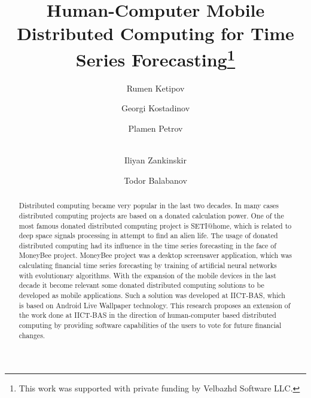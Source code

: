 \documentclass[runningheads]{llncs}
\begin{document}
\title{Human-Computer Mobile Distributed Computing for Time Series Forecasting\thanks{This work was supported with private funding by Velbazhd Software LLC.}}

\author{
	Rumen Ketipov \and
	Georgi Kostadinov \and
	Plamen Petrov \and \\
	Iliyan Zankinskir \and
	Todor Balabanov
}



\maketitle

\begin{abstract}
Distributed computing became very popular in the last two decades. In many cases distributed computing projects are based on a donated calculation power. One of the most famous donated distributed computing project is SETI@home, which is related to deep space signals processing in attempt to find an alien life. The usage of donated distributed computing had its influence in the time series forecasting in the face of MoneyBee\cite{bohn01} project. MoneyBee project was a desktop screensaver application, which was calculating financial time series forecasting by training of artificial neural networks with evolutionary algorithms. With the expansion of the mobile devices in the last decade it become relevant some donated distributed computing solutions to be developed as mobile applications. Such a solution was developed at IICT-BAS\cite{tomov01}, which is based on Android Live Wallpaper technology. This research proposes an extension of the work done at IICT-BAS in the direction of human-computer based distributed computing by providing software capabilities of the users to vote for future financial changes. 

\end{abstract}
\end{document}

